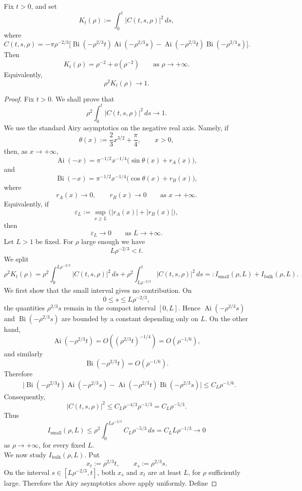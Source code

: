 \documentclass[10pt,a4paper]{amsart}
\newcommand{\Ai}{\operatorname{Ai}}
\newcommand{\Bi}{\operatorname{Bi}}
\begin{document}
\begin{lemma}\label{as}
Fix \(t>0\), and set
\[
  K_t(\rho):=\int_0^t |C(t,s,\rho)|^2\,ds ,
\]
where
\[
C(t,s,\rho)
=
-\pi\rho^{-2/3}
\Big[
 \Bi(-\rho^{2/3}t)\Ai(-\rho^{2/3}s)
 -
 \Ai(-\rho^{2/3}t)\Bi(-\rho^{2/3}s)
\Big].
\]
Then
\[
  K_t(\rho)=\rho^{-2}+o(\rho^{-2})
  \qquad \text{as } \rho\to+\infty.
\]
Equivalently,
\[
  \rho^2K_t(\rho)\longrightarrow 1 .
\]
\end{lemma}

\begin{proof}
Fix \(t>0\). We shall prove that
\[
  \rho^2\int_0^t |C(t,s,\rho)|^2\,ds \longrightarrow 1 .
\]
We use the standard Airy asymptotics on the negative real axis. Namely, if
\[
  \theta(x):=\frac23 x^{3/2}+\frac{\pi}{4},
  \qquad x>0,
\]
then, as \(x\to+\infty\),
\[
  \Ai(-x)
  =
  \pi^{-1/2}x^{-1/4}
  \bigl(\sin\theta(x)+r_A(x)\bigr),
\]
and
\[
  \Bi(-x)
  =
  \pi^{-1/2}x^{-1/4}
  \bigl(\cos\theta(x)+r_B(x)\bigr),
\]
where
\[
  r_A(x)\to0,\qquad r_B(x)\to0
  \qquad \text{as } x\to+\infty.
\]
Equivalently, if
\[
  \varepsilon_L
  :=
  \sup_{x\ge L}\bigl(|r_A(x)|+|r_B(x)|\bigr),
\]
then
\[
  \varepsilon_L\to0
  \qquad \text{as } L\to+\infty.
\]
Let \(L>1\) be fixed. For \(\rho\) large enough we have
\[
  L\rho^{-2/3}<t.
\]
We split
\[
  \rho^2K_t(\rho)
  =
  \rho^2\int_0^{L\rho^{-2/3}} |C(t,s,\rho)|^2\,ds
  +
  \rho^2\int_{L\rho^{-2/3}}^t |C(t,s,\rho)|^2\,ds
  =: I_{\mathrm{small}}(\rho,L)+I_{\mathrm{bulk}}(\rho,L).
\]
We first show that the small interval gives no contribution. On
\[
  0\le s\le L\rho^{-2/3},
\]
the quantities \(\rho^{2/3}s\) remain in the compact interval \([0,L]\). Hence
\(\Ai(-\rho^{2/3}s)\) and \(\Bi(-\rho^{2/3}s)\) are bounded by a constant depending only on \(L\). On the other hand,
\[
  \Ai(-\rho^{2/3}t)=O((\rho^{2/3}t)^{-1/4})
  =O(\rho^{-1/6}),
\]
and similarly
\[
  \Bi(-\rho^{2/3}t)=O(\rho^{-1/6}).
\]
Therefore
\[
\begin{aligned}
 &\Big|
 \Bi(-\rho^{2/3}t)\Ai(-\rho^{2/3}s)
 -
 \Ai(-\rho^{2/3}t)\Bi(-\rho^{2/3}s)
 \Big|
 \le C_L\rho^{-1/6}.
\end{aligned}
\]
Consequently,
\[
  |C(t,s,\rho)|^2
  \le C_L \rho^{-4/3}\rho^{-1/3}
  =
  C_L\rho^{-5/3}.
\]
Thus
\[
  I_{\mathrm{small}}(\rho,L)
  \le
  \rho^2
  \int_0^{L\rho^{-2/3}} C_L\rho^{-5/3}\,ds
  =
  C_L L \rho^{-1/3}
  \longrightarrow 0
\]
as \(\rho\to+\infty\), for every fixed \(L\).\\
We now study \(I_{\mathrm{bulk}}(\rho,L)\). Put
\[
  x_t:=\rho^{2/3}t,\qquad x_s:=\rho^{2/3}s .
\]
On the interval \(s\in[L\rho^{-2/3},t]\), both \(x_s\) and \(x_t\) are at least \(L\), for \(\rho\) sufficiently large. Therefore the Airy asymptotics above apply uniformly. Define

\end{proof}
\end{document}
